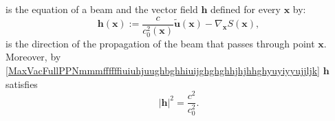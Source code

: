 \documentclass{article}
\theoremstyle{definition}
\theoremstyle{remark}
\renewcommand{\vec}[1]{\mathbf{#1}}
\newcommand{\er}{\eqref}
\newcommand{\er}{\eqref}
\begin{document}
is the equation of a beam and the vector field $\vec h$ defined for
every $\vec x$ by:
\begin{equation}\label{MaxVacFullPPNmmmffffffiuiuhjuughbghhiuijghghghhhfhhghghguygtjuuujjjkyuuy}
\vec h(\vec x):=\frac{c}{c^2_0(\vec x)}\vec {\tilde u}(\vec
x)-\nabla_{\vec x}S(\vec x),
\end{equation}
is the direction of the propagation of the beam that passes through
point $\vec x$. Moreover, by
\er{MaxVacFullPPNmmmffffffiuiuhjuughbghhiuijghghghhjhjhhghyuyiyyujjljk}
$\vec h$ satisfies
\begin{equation}\label{MaxVacFullPPNmmmffffffiuiuhjuughbghhiuijghghghhjhjhhghyuyiyyujjljkgghhg}
|\vec h|^2=\frac{c^2}{c^2_0}.
\end{equation}
\end{document}
